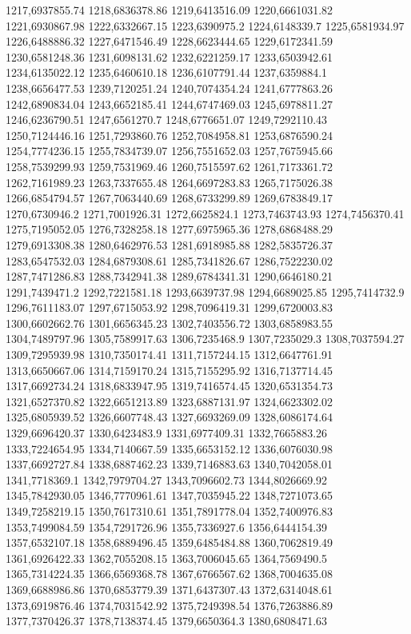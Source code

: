 1217,6937855.74
1218,6836378.86
1219,6413516.09
1220,6661031.82
1221,6930867.98
1222,6332667.15
1223,6390975.2
1224,6148339.7
1225,6581934.97
1226,6488886.32
1227,6471546.49
1228,6623444.65
1229,6172341.59
1230,6581248.36
1231,6098131.62
1232,6221259.17
1233,6503942.61
1234,6135022.12
1235,6460610.18
1236,6107791.44
1237,6359884.1
1238,6656477.53
1239,7120251.24
1240,7074354.24
1241,6777863.26
1242,6890834.04
1243,6652185.41
1244,6747469.03
1245,6978811.27
1246,6236790.51
1247,6561270.7
1248,6776651.07
1249,7292110.43
1250,7124446.16
1251,7293860.76
1252,7084958.81
1253,6876590.24
1254,7774236.15
1255,7834739.07
1256,7551652.03
1257,7675945.66
1258,7539299.93
1259,7531969.46
1260,7515597.62
1261,7173361.72
1262,7161989.23
1263,7337655.48
1264,6697283.83
1265,7175026.38
1266,6854794.57
1267,7063440.69
1268,6733299.89
1269,6783849.17
1270,6730946.2
1271,7001926.31
1272,6625824.1
1273,7463743.93
1274,7456370.41
1275,7195052.05
1276,7328258.18
1277,6975965.36
1278,6868488.29
1279,6913308.38
1280,6462976.53
1281,6918985.88
1282,5835726.37
1283,6547532.03
1284,6879308.61
1285,7341826.67
1286,7522230.02
1287,7471286.83
1288,7342941.38
1289,6784341.31
1290,6646180.21
1291,7439471.2
1292,7221581.18
1293,6639737.98
1294,6689025.85
1295,7414732.9
1296,7611183.07
1297,6715053.92
1298,7096419.31
1299,6720003.83
1300,6602662.76
1301,6656345.23
1302,7403556.72
1303,6858983.55
1304,7489797.96
1305,7589917.63
1306,7235468.9
1307,7235029.3
1308,7037594.27
1309,7295939.98
1310,7350174.41
1311,7157244.15
1312,6647761.91
1313,6650667.06
1314,7159170.24
1315,7155295.92
1316,7137714.45
1317,6692734.24
1318,6833947.95
1319,7416574.45
1320,6531354.73
1321,6527370.82
1322,6651213.89
1323,6887131.97
1324,6623302.02
1325,6805939.52
1326,6607748.43
1327,6693269.09
1328,6086174.64
1329,6696420.37
1330,6423483.9
1331,6977409.31
1332,7665883.26
1333,7224654.95
1334,7140667.59
1335,6653152.12
1336,6076030.98
1337,6692727.84
1338,6887462.23
1339,7146883.63
1340,7042058.01
1341,7718369.1
1342,7979704.27
1343,7096602.73
1344,8026669.92
1345,7842930.05
1346,7770961.61
1347,7035945.22
1348,7271073.65
1349,7258219.15
1350,7617310.61
1351,7891778.04
1352,7400976.83
1353,7499084.59
1354,7291726.96
1355,7336927.6
1356,6444154.39
1357,6532107.18
1358,6889496.45
1359,6485484.88
1360,7062819.49
1361,6926422.33
1362,7055208.15
1363,7006045.65
1364,7569490.5
1365,7314224.35
1366,6569368.78
1367,6766567.62
1368,7004635.08
1369,6688986.86
1370,6853779.39
1371,6437307.43
1372,6314048.61
1373,6919876.46
1374,7031542.92
1375,7249398.54
1376,7263886.89
1377,7370426.37
1378,7138374.45
1379,6650364.3
1380,6808471.63
